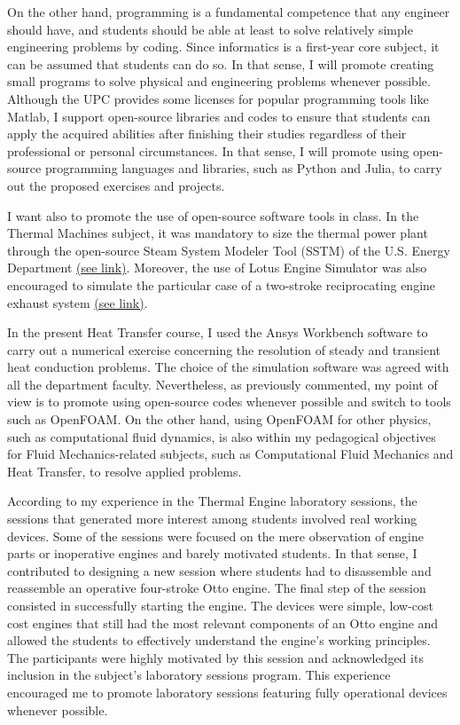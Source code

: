 \documentclass{article}
\begin{document}
On the other hand, programming is a fundamental competence that any engineer should have, and students should be able at least to solve relatively simple engineering problems by coding. Since informatics is a first-year core subject, it can be assumed that students can do so. In that sense, I will promote creating small programs to solve physical and engineering problems whenever possible. Although the UPC provides some licenses for popular programming tools like Matlab, I support open-source libraries and codes to ensure that students can apply the acquired abilities after finishing their studies regardless of their professional or personal circumstances. In that sense, I will promote using open-source programming languages and libraries, such as Python and Julia, to carry out the proposed exercises and projects. 

I want also to promote the use of open-source software tools in class. In the Thermal Machines subject, it was mandatory to size the thermal power plant through the open-source Steam System Modeler Tool (SSTM) of the U.S. Energy Department \href{https://www4.eere.energy.gov/manufacturing/tech_deployment/amo_steam_tool/overview}{(see link)}. Moreover, the use of Lotus Engine Simulator was also encouraged to simulate the particular case of a two-stroke reciprocating engine exhaust system \href{https://www.lotusengineering.com/engineering-software/}{(see link)}. 

In the present Heat Transfer course, I used the Ansys Workbench software to carry out a numerical exercise concerning the resolution of steady and transient heat conduction problems. The choice of the simulation software was agreed with all the department faculty. Nevertheless, as previously commented, my point of view is to promote using open-source codes whenever possible and switch to tools such as OpenFOAM. On the other hand, using OpenFOAM for other physics, such as computational fluid dynamics, is also within my pedagogical objectives for Fluid Mechanics-related subjects, such as Computational Fluid Mechanics and Heat Transfer, to resolve applied problems. 

According to my experience in the Thermal Engine laboratory sessions, the sessions that generated more interest among students involved real working devices. Some of the sessions were focused on the mere observation of engine parts or inoperative engines and barely motivated students. In that sense, I contributed to designing a new session where students had to disassemble and reassemble an operative four-stroke Otto engine. The final step of the session consisted in successfully starting the engine. The devices were simple, low-cost cost engines that still had the most relevant components of an Otto engine and allowed the students to effectively understand the engine's working principles. The participants were highly motivated by this session and acknowledged its inclusion in the subject's laboratory sessions program. This experience encouraged me to promote laboratory sessions featuring fully operational devices whenever possible. 
\end{document}
